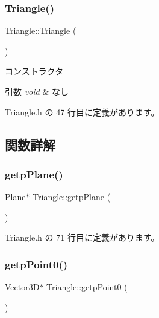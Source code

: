 \subsubsection{\texorpdfstring{Triangle()}{Triangle()}}
{\footnotesize\ttfamily Triangle\+::\+Triangle (\begin{DoxyParamCaption}{ }\end{DoxyParamCaption})\hspace{0.3cm}{\ttfamily [inline]}}



コンストラクタ 


\begin{DoxyParams}{引数}
{\em void} & なし \\
\hline
\end{DoxyParams}


 Triangle.\+h の 47 行目に定義があります。



\subsection{関数詳解}
\mbox{\label{class_triangle_a559a6888cea5697dfd3943fa4a153d07}} 
\subsubsection{\texorpdfstring{getp\+Plane()}{getpPlane()}}
{\footnotesize\ttfamily \mbox{\hyperlink{class_plane}{Plane}}$\ast$ Triangle\+::getp\+Plane (\begin{DoxyParamCaption}{ }\end{DoxyParamCaption})\hspace{0.3cm}{\ttfamily [inline]}}



 Triangle.\+h の 71 行目に定義があります。

\mbox{\label{class_triangle_a0f6221dde9919de0067299847f4966b8}} 
\subsubsection{\texorpdfstring{getp\+Point0()}{getpPoint0()}}
{\footnotesize\ttfamily \mbox{\hyperlink{class_vector3_d}{Vector3D}}$\ast$ Triangle\+::getp\+Point0 (\begin{DoxyParamCaption}{ }\end{DoxyParamCaption})\hspace{0.3cm}{\ttfamily [inline]}}



